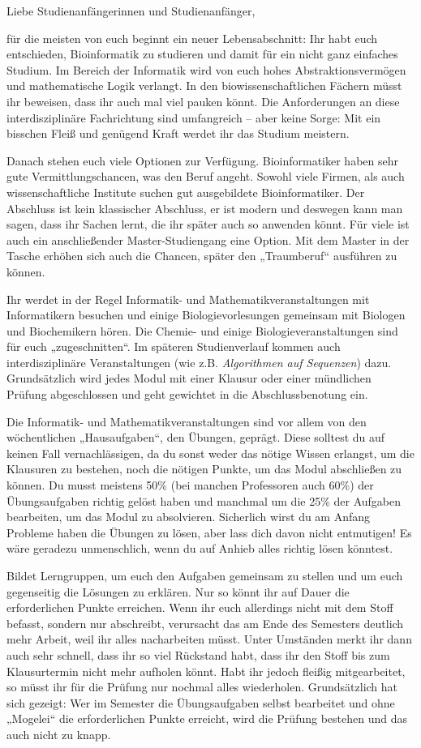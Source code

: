 Liebe Studienanfängerinnen und Studienanfänger,

für die meisten von euch beginnt ein neuer Lebensabschnitt:
Ihr habt euch entschieden, Bioinformatik zu studieren und damit für ein nicht ganz einfaches Studium.
Im Bereich der Informatik wird von euch hohes Abstraktionsvermögen und mathematische Logik verlangt.
In den biowissenschaftlichen Fächern müsst ihr beweisen, dass ihr auch mal viel pauken könnt.
Die Anforderungen an diese interdisziplinäre Fachrichtung sind umfangreich – aber keine Sorge:
Mit ein bisschen Fleiß und genügend Kraft werdet ihr das Studium meistern.

Danach stehen euch viele Optionen zur Verfügung.
Bioinformatiker haben sehr gute Vermittlungschancen, was den Beruf angeht.
Sowohl viele Firmen, als auch wissenschaftliche Institute suchen gut ausgebildete Bioinformatiker.
Der Abschluss ist kein klassischer Abschluss, er ist modern und deswegen kann man sagen, dass ihr Sachen lernt, die ihr später auch so anwenden könnt.
Für viele ist auch ein anschließender Master-Studiengang eine Option.
Mit dem Master in der Tasche erhöhen sich auch die Chancen, später den „Traumberuf“ ausführen zu können.

Ihr werdet in der Regel Informatik- und Mathematikveranstaltungen mit Informatikern besuchen und einige Biologievorlesungen gemeinsam mit Biologen und Biochemikern hören.
Die Chemie- und einige Biologieveranstaltungen sind für euch „zugeschnitten“.
Im späteren Studienverlauf kommen auch interdisziplinäre Veranstaltungen (wie z.B. \textit{Algorithmen auf Sequenzen}) dazu.
Grundsätzlich wird jedes Modul mit einer Klausur oder einer mündlichen Prüfung abgeschlossen und geht gewichtet in die Abschlussbenotung ein.

Die Informatik- und Mathematikveranstaltungen sind vor allem von den wöchent\-lichen „Hausaufgaben“, den Übungen, geprägt.
Diese solltest du auf keinen Fall vernachlässigen, da du sonst weder das nötige Wissen erlangst, um die Klausuren zu bestehen, noch die nötigen Punkte, um das Modul abschließen zu können.
Du musst meistens 50\% (bei manchen Professoren auch 60\%) der Übungsaufgaben richtig gelöst haben und manchmal um die 25\% der Aufgaben bearbeiten, um das Modul zu absolvieren.
Sicherlich wirst du am Anfang Probleme haben die Übungen zu lösen, aber lass dich davon nicht entmutigen!
Es wäre geradezu unmenschlich, wenn du auf Anhieb alles richtig lösen könntest.

Bildet Lerngruppen, um euch den Aufgaben gemeinsam zu stellen und um euch gegenseitig die Lösungen zu erklären.
Nur so könnt ihr auf Dauer die erforderlichen Punkte erreichen.
Wenn ihr euch allerdings nicht mit dem Stoff befasst, sondern nur abschreibt, verursacht das am Ende des Semesters deutlich mehr Arbeit, weil ihr alles nacharbeiten müsst.
Unter Umständen merkt ihr dann auch sehr schnell, dass ihr so viel Rückstand habt, dass ihr den Stoff bis zum Klausurtermin nicht mehr aufholen könnt. Habt ihr jedoch fleißig mitgearbeitet, so müsst ihr für die Prüfung nur nochmal alles wiederholen.
Grundsätzlich hat sich gezeigt:
Wer im Semester die Übungsaufgaben selbst bearbeitet und ohne „Mogelei“ die erforderlichen Punkte erreicht, wird die Prüfung bestehen und das auch nicht zu knapp.


